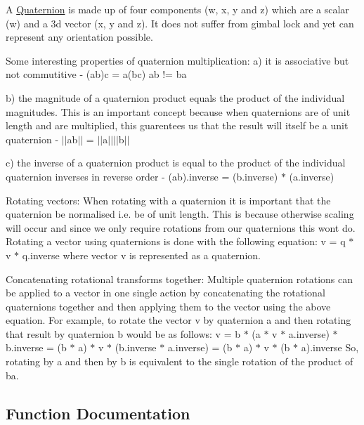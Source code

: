 A \hyperlink{classprism_1_1_quaternion}{Quaternion} is made up of four components (w, x, y and z) which are a scalar (w) and a 3d vector (x, y and z). It does not suffer from gimbal lock and yet can represent any orientation possible.

Some interesting properties of quaternion multiplication\+: a) it is associative but not commutitive -\/ (ab)c = a(bc) ab != ba

b) the magnitude of a quaternion product equals the product of the individual magnitudes. This is an important concept because when quaternions are of unit length and are multiplied, this guarentees us that the result will itself be a unit quaternion -\/ $\vert$$\vert$ab$\vert$$\vert$ = $\vert$$\vert$a$\vert$$\vert$$\vert$$\vert$b$\vert$$\vert$

c) the inverse of a quaternion product is equal to the product of the individual quaternion inverses in reverse order -\/ (ab).inverse = (b.\+inverse) $\ast$ (a.\+inverse)

Rotating vectors\+: When rotating with a quaternion it is important that the quaternion be normalised i.\+e. be of unit length. This is because otherwise scaling will occur and since we only require rotations from our quaternions this won\textquotesingle{}t do. Rotating a vector using quaternions is done with the following equation\+: v\textquotesingle{} = q $\ast$ v $\ast$ q.\+inverse where vector v is represented as a quaternion.

Concatenating rotational transforms together\+: Multiple quaternion rotations can be applied to a vector in one single action by concatenating the rotational quaternions together and then applying them to the vector using the above equation. For example, to rotate the vector v by quaternion a and then rotating that result by quaternion b would be as follows\+: v\textquotesingle{} = b $\ast$ (a $\ast$ v $\ast$ a.\+inverse) $\ast$ b.\+inverse = (b $\ast$ a) $\ast$ v $\ast$ (b.\+inverse $\ast$ a.\+inverse) = (b $\ast$ a) $\ast$ v $\ast$ (b $\ast$ a).inverse So, rotating by a and then by b is equivalent to the single rotation of the product of ba. 

\subsection{Function Documentation}
